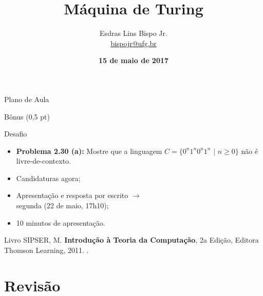 \documentclass[xcolor=dvipsnames,table]{beamer}
\title{Máquina de Turing}
\author{
  Esdras Lins Bispo Jr. \\ \url{bispojr@ufg.br}
  }
\institute{
  Teoria da Computação \\Bacharelado em Ciência da Computação}
\date{\textbf{15 de maio de 2017} }
\begin{document}
	\begin{frame}
		\titlepage
	\end{frame}

	\AtBeginSection{
		\begin{frame}{Sumário}%
    		\tableofcontents[currentsection]
		\end{frame}
	}

	\begin{frame}{Plano de Aula}
		\tableofcontents
	\end{frame}

	\begin{frame}{Bônus (0,5 pt)}
		\begin{block}{Desafio}
			\begin{itemize}
				\item {\bf Problema 2.30 (a):} Mostre que a linguagem $C =  \{0^n 1^n 0^n 1^n \mbox{ | } n \geq 0\}$ não é livre-de-contexto. 
				\item Candidaturas agora; 
				\item Apresentação e resposta por escrito $\rightarrow$ \\segunda (22 de maio, 17h10); 
				\item 10 minutos de apresentação.
			\end{itemize}
		\end{block} 
		\begin{block}{Livro}
			SIPSER, M. {\bf Introdução à Teoria da Computação}, 2a Edição, Editora Thomson Learning, 2011. \color{blue}{\bf Código Bib.: [004 SIP/int]}.
		\end{block}
	\end{frame}
    
    \section{Revisão}
\end{document}
